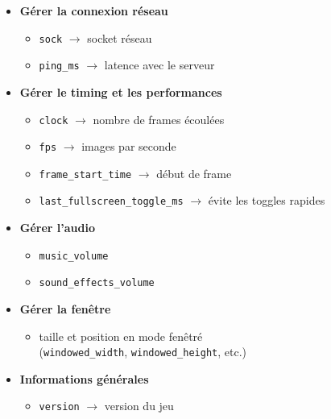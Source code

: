 \documentclass[12pt,a4paper]{article}
\begin{document}
\begin{itemize}
\begin{itemize}
                    \item \textbf{Gérer la connexion réseau}
                    \begin{itemize}
                        \item \texttt{sock} $\rightarrow$ socket réseau
                        \item \texttt{ping\_ms} $\rightarrow$ latence avec le serveur
                    \end{itemize}

                    \item \textbf{Gérer le timing et les performances}
                    \begin{itemize}
                        \item \texttt{clock} $\rightarrow$ nombre de frames écoulées
                        \item \texttt{fps} $\rightarrow$ images par seconde
                        \item \texttt{frame\_start\_time} $\rightarrow$ début de frame
                        \item \texttt{last\_fullscreen\_toggle\_ms} $\rightarrow$ évite les toggles rapides
                    \end{itemize}

                    \item \textbf{Gérer l’audio}
                    \begin{itemize}
                        \item \texttt{music\_volume}
                        \item \texttt{sound\_effects\_volume}
                    \end{itemize}

                    \item \textbf{Gérer la fenêtre}
                    \begin{itemize}
                        \item taille et position en mode fenêtré \\
                            (\texttt{windowed\_width}, \texttt{windowed\_height}, etc.)
                    \end{itemize}

                    \item \textbf{Informations générales}
                    \begin{itemize}
                        \item \texttt{version} $\rightarrow$ version du jeu
                    \end{itemize}
                \end{itemize}
        \end{itemize}
\end{document}
